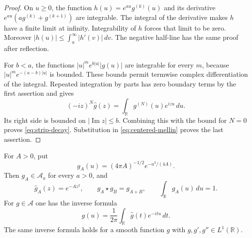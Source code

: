 \documentclass[11pt]{article}
\numberwithin{equation}{section}
\newcommand{\R}{\mathbb R}
\newcommand{\A}{\mathcal A}
\begin{document}
\begin{proof}
On $u\geq0$, the function $h(u)=e^{au}g^{(k)}(u)$ and its derivative
$e^{au}(ag^{(k)}+g^{(k+1)})$ are integrable.
The integral of the derivative makes $h$ have a finite limit at infinity.
Integrability of $h$ forces that limit to be zero.
Moreover $|h(u)|\leq\int_u^\infty|h'(v)|\,dv$.
The negative half-line has the same proof after reflection.

For $b<a$, the functions $|u|^m e^{b|u|}|g(u)|$ are integrable for every
$m$, because $|u|^m e^{-(a-b)|u|}$ is bounded.
These bounds permit termwise complex differentiation of the integral.
Repeated integration by parts has zero boundary terms by the first assertion
and gives
\[
 (-iz)^N\widehat g(z)=\int_{\R}g^{(N)}(u)e^{izu}\,du.
\]
Its right side is bounded on $|\operatorname{Im}z|\leq b$.
Combining this with the bound for $N=0$ proves \eqref{eq:strip-decay}.
Substitution in \eqref{eq:centered-mellin} proves the last assertion.
\end{proof}

\begin{lemma}
\label{lem:gaussian}
For $A>0$, put
\[
 g_A(u)=(4\pi A)^{-1/2}e^{-u^2/(4A)}.
\]
Then $g_A\in\A_a$ for every $a>0$, and
\begin{equation}
 \widehat g_A(z)=e^{-Az^2},\qquad
 g_A\star g_B=g_{A+B},\qquad \int_{\R}g_A(u)\,du=1.
 \label{eq:gaussian}
\end{equation}
For $g\in\A$ one has the inverse formula
\begin{equation}
 g(u)=\frac1{2\pi}\int_{\R}\widehat g(t)e^{-itu}\,dt.
 \label{eq:inverse}
\end{equation}
The same inverse formula holds for a smooth function $g$ with
$g,g',g''\in L^1(\R)$.
\end{lemma}
\end{document}
